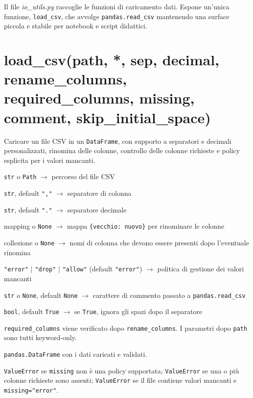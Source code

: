 
Il file \textit{io\_utils.py} raccoglie le funzioni di caricamento dati. Espone un'unica funzione, \texttt{load\_csv}, che avvolge \texttt{pandas.read\_csv} mantenendo una surface piccola e stabile per notebook e script didattici.

\section{\texorpdfstring{load\_csv(path, *, sep, decimal, rename\_columns, required\_columns, missing, comment, skip\_initial\_space)}{load\_csv(path, *, sep, decimal, rename_columns, required_columns, missing, comment, skip_initial_space)}}
\label{sec:load-csv}
\begin{apidesc}
  \item[\textbf{Scopo}]
    Caricare un file CSV in un \texttt{DataFrame}, con supporto a separatori e decimali personalizzati, rinomina delle colonne, controllo delle colonne richieste e policy esplicita per i valori mancanti.
  \item[\textbf{Parametri}]\hfill
    \begin{description}[font=\normalfont\ttfamily\bfseries, labelwidth=9em, leftmargin=9.5em, itemsep=1pt, parsep=0pt, topsep=2pt]
      \item[path] \texttt{str} o \texttt{Path} $\to$ percorso del file CSV
      \item[sep] \texttt{str}, default \texttt{","} $\to$ separatore di colonna
      \item[decimal] \texttt{str}, default \texttt{"."} $\to$ separatore decimale
      \item[rename\_columns] mapping o \texttt{None} $\to$ mappa \texttt{\{vecchio: nuovo\}} per rinominare le colonne
      \item[required\_columns] collezione o \texttt{None} $\to$ nomi di colonna che devono essere presenti dopo l'eventuale rinomina
      \item[missing] \texttt{"error"} $\mid$ \texttt{"drop"} $\mid$ \texttt{"allow"} (default \texttt{"error"}) $\to$ politica di gestione dei valori mancanti
      \item[comment] \texttt{str} o \texttt{None}, default \texttt{None} $\to$ carattere di commento passato a \texttt{pandas.read\_csv}
      \item[skip\_initial\_space] \texttt{bool}, default \texttt{True} $\to$ se \texttt{True}, ignora gli spazi dopo il separatore
    \end{description}
  \item[\textbf{Note}]
    \texttt{required\_columns} viene verificato dopo \texttt{rename\_columns}. I parametri dopo \texttt{path} sono tutti keyword-only.
  \item[\textbf{Restituisce}]
    \texttt{pandas.DataFrame} con i dati caricati e validati.
  \item[\textbf{Eccezioni}]
    \texttt{ValueError} se \texttt{missing} non è una policy supportata;
    \texttt{ValueError} se una o più colonne richieste sono assenti;
    \texttt{ValueError} se il file contiene valori mancanti e \texttt{missing="error"}.
\end{apidesc}

